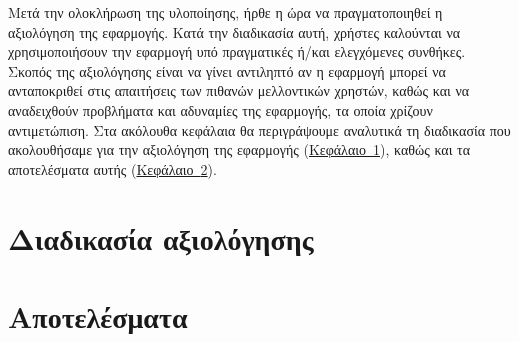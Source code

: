 
Μετά την ολοκλήρωση της υλοποίησης, ήρθε η ώρα να πραγματοποιηθεί η αξιολόγηση της εφαρμογής. Κατά την διαδικασία αυτή, χρήστες καλούνται να χρησιμοποιήσουν την εφαρμογή υπό πραγματικές ή/και ελεγχόμενες συνθήκες. Σκοπός της αξιολόγησης είναι να γίνει αντιληπτό αν η εφαρμογή μπορεί να ανταποκριθεί στις απαιτήσεις των πιθανών μελλοντικών χρηστών, καθώς και να αναδειχθούν προβλήματα και αδυναμίες της εφαρμογής, τα οποία χρίζουν αντιμετώπιση. Στα ακόλουθα κεφάλαια θα περιγράψουμε αναλυτικά τη διαδικασία που ακολουθήσαμε για την αξιολόγηση της εφαρμογής (\hyperref[sec:evaluationProcess]{Κεφάλαιο~\ref*{sec:evaluationProcess}}), καθώς και τα αποτελέσματα αυτής (\hyperref[sec:evaluationResults]{Κεφάλαιο~\ref*{sec:evaluationResults}}).


\section{Διαδικασία αξιολόγησης}\label{sec:evaluationProcess}


\section{Αποτελέσματα}\label{sec:evaluationResults}
